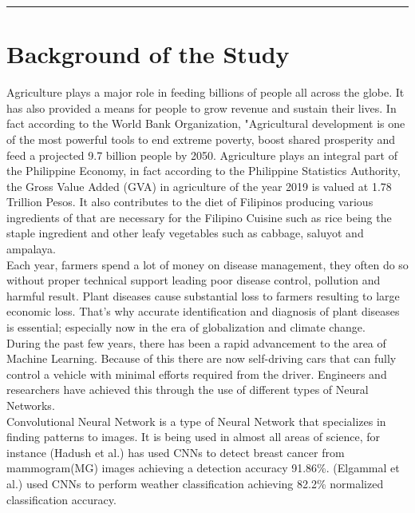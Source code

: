 
\vspace{-1cm}\noindent\rule{\textwidth}{0.4pt}

\section{Background of the Study}

Agriculture plays a major role in feeding billions of people all
across the globe. It has also provided a means for people
to grow revenue and sustain their lives. In fact according to the 
World Bank Organization, "Agricultural development 
is one of the most powerful tools to end extreme poverty, 
boost shared prosperity and feed a projected 9.7 billion people by 2050.
Agriculture plays an integral 
part of the Philippine Economy, 
in fact according to the Philippine Statistics Authority, the Gross 
Value Added (GVA) in agriculture of the year 2019
is valued at 1.78 Trillion Pesos. 
It also contributes to the diet of Filipinos producing various 
ingredients of that are necessary for the Filipino Cuisine such as rice 
being the staple ingredient and other leafy vegetables such as cabbage,
saluyot and ampalaya. \\



Each year, farmers spend a lot of money on disease management, they 
often do so without proper technical support leading poor disease 
control, pollution and harmful result. Plant diseases cause 
substantial loss to farmers resulting to large economic loss.
That's why accurate identification and diagnosis of plant diseases is 
essential; especially now in the era of globalization and climate 
change. \\

During the past few years, there has been a rapid advancement to the
area of Machine Learning. Because of this there are now self-driving cars 
that can fully control a vehicle with minimal efforts required from the
driver. Engineers and researchers have achieved this through the use 
of different types of Neural Networks. \\

Convolutional Neural Network is a type of Neural Network that specializes 
in finding patterns to images. It is being used in almost all areas of science, 
for instance (Hadush et al.) has used CNNs to detect breast 
cancer from mammogram(MG) images achieving a detection accuracy 91.86\%. 
(Elgammal et al.) used CNNs to perform weather classification achieving 
82.2\% normalized classification accuracy.
\\

